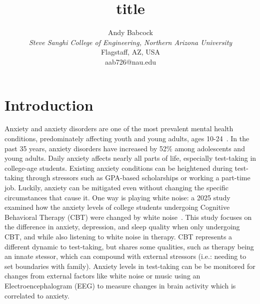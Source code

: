 \documentclass[journal]{IEEEtran}
\begin{document}
\title{title}

\author{Andy Babcock \\
    \textit{Steve Sanghi College of Engineering, Northern Arizona University} \\
    Flagstaff, AZ, USA \\
    aab726@nau.edu
}

\maketitle


\section{Introduction}
Anxiety and anxiety disorders are one of the most prevalent mental health conditions, predominately affecting youth and young adults, ages 10-24~\cite{BieFengsai2024Rgbo}. In the past 35 years, anxiety disorders have increased by 52\% among adolescents and young adults. Daily anxiety affects nearly all parts of life, especially test-taking in college-age students. Existing anxiety conditions can be heightened during test-taking through stressors such as GPA-based scholarships or working a part-time job. Luckily, anxiety can be mitigated even without changing the specific circumstances that cause it. One way is playing white noise: a 2025 study examined how the anxiety levels of college students undergoing Cognitive Behavioral Therapy (CBT) were changed by white noise~\cite{LiLi2025EoWN}. This study focuses on the difference in anxiety, depression, and sleep quality when only undergoing CBT, and while also listening to white noise in therapy. CBT represents a different dynamic to test-taking, but shares some qualities, such as therapy being an innate stessor, which can compound with external stressors (i.e.: needing to set boundaries with family). Anxiety levels in test-taking can be be monitored for changes from external factors like white noise or music using an Electroencephalogram (EEG) to measure changes in brain activity which is correlated to anxiety.
\end{document}
